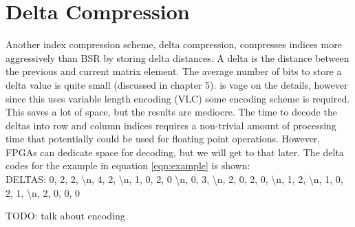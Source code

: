 \section{Delta Compression}
\par Another index compression scheme, delta compression, compresses indices more aggressively than BSR by storing delta distances. A delta is the distance between the previous and current matrix element. The average number of bits to store a delta value is quite small (discussed in chapter 5). \cite{prelim:kourtis} is vage on the details, however since this uses variable length encoding (VLC) some encoding scheme is required. This saves a lot of space, but the results are mediocre. The time to decode the deltas into row and column indices requires a non-trivial amount of processing time that potentially could be used for floating point operations. However, FPGAs can dedicate space for decoding, but we will get to that later. The delta codes for the example in equation \ref{eqn:example} is shown:\\
DELTAS: 0, 2, 2, \textbackslash n, 4, 2, \textbackslash n, 1, 0, 2, 0 \textbackslash n, 0, 3, \textbackslash n, 2, 0, 2, 0, \textbackslash n, 1, 2, \textbackslash n, 1, 0, 2, 1, \textbackslash n, 2, 0, 0, 0\par
TODO: talk about encoding
